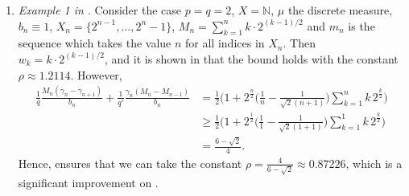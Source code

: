 \documentclass[oneside,10pt]{article}          %
\newtheorem{rem}{Remark}
\numberwithin{equation}{section}
\begin{document}
\begin{enumerate}
    \item \emph{Example 1 in \cite{Bouthat2023}}. Consider the case $p=q=2$, $X=\mathbb{N}$, $\mu$ the discrete measure, $b_n\equiv1$, $X_n=\{2^{n-1},\dots,2^n-1\}$, $M_n = \sum_{k=1}^n k\cdot 2^{(k-1)/2}$ and $m_n$ is the sequence which takes the value $n$ for all indices in $X_n$. Then $w_k=k\cdot 2^{(k-1)/2}$, and it is shown in \cite{Bouthat2023} that the bound holds with the constant $\rho \approx 1.2114$. However, 
    \begin{align*}
        \frac{1}{q}\frac{M_n(\gamma_n-\gamma_{n+1})}{b_n}
    +\frac{1}{q'}\frac{\gamma_n(M_n-M_{n-1})}{b_n}
        &= \frac{1}{2} \!\bigg(1+2^{\frac{n}{2}}\bigg(\frac{1}{n}-\frac{1}{\sqrt{2}(n+1)}\bigg)\sum_{k=1}^{n}k\,2^{\frac{k}{2}} \bigg) \\
        &\geq \frac{1}{2} \!\bigg(1+2^{\frac{1}{2}}\bigg(\frac{1}{1}-\frac{1}{\sqrt{2}(1+1)}\bigg)\sum_{k=1}^{1}k\,2^{\frac{k}{2}} \bigg) \\
        &= \frac{6-\sqrt{2}}{4}.
    \end{align*}
    Hence,  ensures that we can take the constant $\rho = \frac{4}{6-\sqrt{2}} \approx 0.87226$, which is a significant improvement on \cite[Example 1]{Bouthat2023}.
\end{enumerate}












\end{document}
